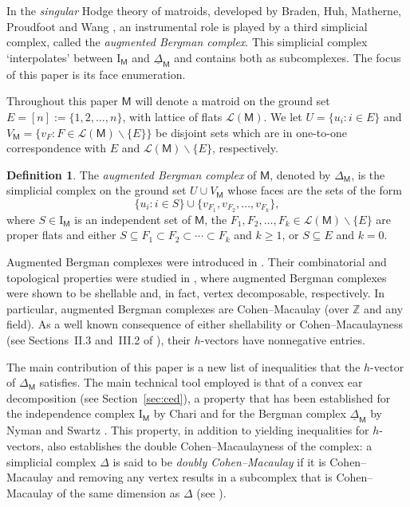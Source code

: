 \documentclass[11pt]{amsart}
\theoremstyle{theorems}
\theoremstyle{definition}
\newtheorem{definition}[theorem]{Definition}
\newcommand{\lL}{{\mathcal L}}
\newcommand{\ZZ}{{\mathbb Z}}
\newcommand{\M}{{\mathsf{M}}}
\newcommand{\I}{{\mathrm{I}}}
\newcommand{\uDelta}{\underline{\Delta}}
\newcommand{\sm}{{\smallsetminus}}
\begin{document}
In the \emph{singular} Hodge theory of matroids, developed by Braden, Huh, 
Matherne, Proudfoot and Wang \cite{BHMPW1,BHMPW2}, an instrumental role is 
played by a third simplicial complex, called the \emph{augmented Bergman 
complex}. This simplicial complex `interpolates' between $\I_{\M}$ and 
$\uDelta_{\M}$ and contains both as subcomplexes. The focus of this paper 
is its face enumeration.

Throughout this paper $\M$ will denote a matroid on the ground set $E = 
[n] := \{1, 2,\dots,n\}$, with lattice of flats $\lL(\M)$. We let $U = 
\{u_i : i \in E\}$ and $V_{\M} = \{v_F : F \in \lL(\M) \sm \{E\} \}$ be 
disjoint sets which are in one-to-one correspondence with $E$ and 
$\lL(\M) \sm \{E\}$, respectively.
%
\begin{definition} \label{def:augmented}
The \emph{augmented Bergman complex} of $\M$, denoted by $\Delta_{\M}$, 
is the simplicial complex on the ground set $U \cup V_{\M}$ whose faces 
are the sets of the form 
%
\begin{equation} \label{eq:Omega-faces}
\{u_i : i \in S \} \cup \{ v_{F_1}, v_{F_2},\dots,v_{F_k} \},
\end{equation}
%
where $S \in \I_{\M}$ is an independent set of $\M$, the $F_1, 
F_2,\dots,F_k \in \lL(\M) \sm \{E\}$ are proper flats and either 
$S \subseteq F_1 \subset F_2 \subset \cdots \subset F_k$ and $k \ge 1$, 
or $S \subseteq E$ and $k = 0$. 
\end{definition}
%

Augmented Bergman complexes were introduced in \cite{BHMPW1}. 
Their combinatorial and topological properties were studied in 
\cite{BKR22, AJ23}, where augmented Bergman complexes were shown to
be shellable and, in fact, vertex decomposable, respectively. In
particular, augmented Bergman complexes are Cohen--Macaulay (over 
$\ZZ$ and any field). As a well known consequence of either 
shellability or Cohen--Macaulayness (see Sections~II.3 and~III.2 
of \cite{Sta96}), their $h$-vectors have nonnegative entries.

The main contribution of this paper is a new list of inequalities 
that the $h$-vector of $\Delta_{\M}$ satisfies. The main technical 
tool employed is that of a convex ear decomposition (see 
Section~\ref{sec:ced}), a property that has been established 
for the independence complex $\I_{\M}$ by Chari \cite{Ch97} and for 
the Bergman complex $\uDelta_{\M}$ by Nyman and Swartz \cite{NS04}. 
This property, in addition to yielding inequalities for $h$-vectors, 
also establishes the double Cohen--Macaulayness of the complex: a 
simplicial complex $\Delta$ is said to be 
\emph{doubly Cohen--Macaulay} if it is Cohen--Macaulay and removing 
any vertex results in a subcomplex that 
is Cohen--Macaulay of the same dimension as $\Delta$ (see 
\cite[Section~III.3]{Sta96}).
\end{document}
